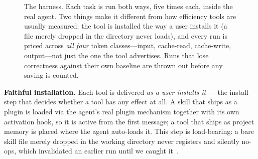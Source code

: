 \begin{figure}[t]
\centering
{}
\caption{The harness. Each task is run both ways, five times each, inside the real agent. Two things
make it different from how efficiency tools are usually measured: the tool is installed the way a user
installs it (a file merely dropped in the directory never loads), and every run is priced across
\emph{all four} token classes---input, cache-read, cache-write, output---not just the one the tool
advertises. Runs that lose correctness against their own baseline are thrown out before any saving is
counted.}
\label{fig:harness}
\end{figure}

\textbf{Faithful installation.} Each tool is delivered \emph{as a user installs it} --- the
install step that decides whether a tool has any effect at all. A
skill that ships as a plugin is loaded via the agent's real plugin mechanism together with its own
activation hook, so it is active from the first message; a tool that ships as project memory is placed
where the agent auto-loads it. This step is load-bearing: a bare skill file merely dropped in the working
directory never registers and silently no-ops, which invalidated an earlier run until we caught
it~\cite{biderman2024lessons}.

